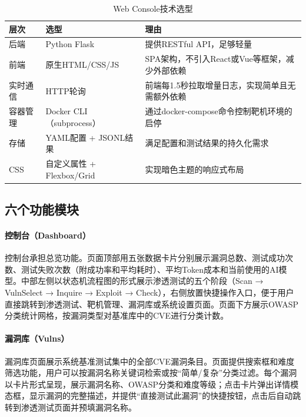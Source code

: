 \begin{table}[htbp]
\centering
\caption{Web Console技术选型} \label{tab:ch3:6}
  \renewcommand{\arraystretch}{1.3}
\begin{tabular}{lll}
    \toprule
层次 & 选型 & 理由 \\
    \midrule
后端 & Python Flask & 提供RESTful API，足够轻量 \\
    \midrule
前端 & 原生HTML/CSS/JS & SPA架构，不引入React或Vue等框架，减少外部依赖 \\
    \midrule
实时通信 & HTTP轮询 & 前端每1.5秒拉取增量日志，实现简单且无需额外依赖 \\
    \midrule
容器管理 & Docker CLI（subprocess） & 通过docker-compose命令控制靶机环境的启停 \\
    \midrule
存储 & YAML配置 + JSONL结果 & 满足配置和测试结果的持久化需求 \\
    \midrule
CSS & 自定义属性 + Flexbox/Grid & 实现暗色主题的响应式布局 \\
    \bottomrule
\end{tabular}
\end{table}

\subsection{六个功能模块}

\paragraph{控制台（Dashboard）}

控制台承担总览功能。页面顶部用五张数据卡片分别展示漏洞总数、测试成功次数、测试失败次数（附成功率和平均耗时）、平均Token成本和当前使用的AI模型。中部左侧以状态机流程图的形式展示渗透测试的五个阶段（Scan → VulnSelect → Inquire → Exploit → Check），右侧放置快捷操作入口，便于用户直接跳转到渗透测试、靶机管理、漏洞库或系统设置页面。页面下方展示OWASP分类统计网格，按漏洞类型对基准库中的CVE进行分类计数。

\paragraph{漏洞库（Vulns）}

漏洞库页面展示系统基准测试集中的全部CVE漏洞条目。页面提供搜索框和难度筛选功能，用户可以按漏洞名称关键词检索或按“简单/复杂”分类过滤。每个漏洞以卡片形式呈现，展示漏洞名称、OWASP分类和难度等级；点击卡片弹出详情模态框，显示漏洞的完整描述，并提供“直接测试此漏洞”的快捷按钮，点击后自动跳转到渗透测试页面并预填漏洞名称。

